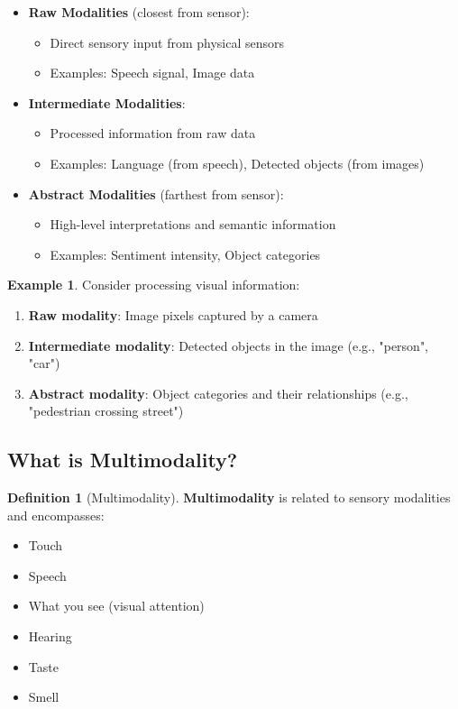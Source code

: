 \documentclass[11pt,a4paper]{article}
\theoremstyle{definition}
\newtheorem{definition}{Definition}[section]
\newtheorem{example}{Example}[section]
\theoremstyle{plain}
\theoremstyle{remark}
\begin{document}
\begin{itemize}
    \item \textbf{Raw Modalities} (closest from sensor):
    \begin{itemize}
        \item Direct sensory input from physical sensors
        \item Examples: Speech signal, Image data
    \end{itemize}
    
    \item \textbf{Intermediate Modalities}:
    \begin{itemize}
        \item Processed information from raw data
        \item Examples: Language (from speech), Detected objects (from images)
    \end{itemize}
    
    \item \textbf{Abstract Modalities} (farthest from sensor):
    \begin{itemize}
        \item High-level interpretations and semantic information
        \item Examples: Sentiment intensity, Object categories
    \end{itemize}
\end{itemize}

\begin{example}
Consider processing visual information:
\begin{enumerate}
    \item \textbf{Raw modality}: Image pixels captured by a camera
    \item \textbf{Intermediate modality}: Detected objects in the image (e.g., "person", "car")
    \item \textbf{Abstract modality}: Object categories and their relationships (e.g., "pedestrian crossing street")
\end{enumerate}
\end{example}

\subsection{What is Multimodality?}

\begin{definition}[Multimodality]
\textbf{Multimodality} is related to sensory modalities and encompasses:
\begin{itemize}
    \item Touch
    \item Speech
    \item What you see (visual attention)
    \item Hearing
    \item Taste
    \item Smell
\end{itemize}
\end{definition}
\end{document}
